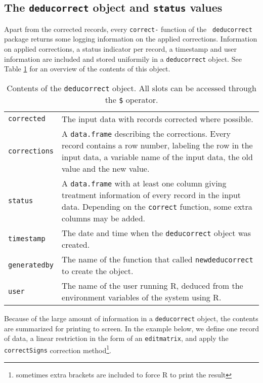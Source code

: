 \documentclass[11pt, fleqn, a4paper]{article}
\begin{document}
\subsection{The {\tt deducorrect} object and {\tt status} values}
\label{deducorrectObjectSection}
Apart from the corrected records, every {\tt correct-} function of the {\tt
deducorrect} package returns some logging information on the applied
corrections. Information on applied corrections, a status indicator per record,
a timestamp and user information are included and stored uniformily in a
{\tt deducorrect} object. See Table \ref{deducorrectObject} for an
overview of the contents of this object.
%
\begin{table}
\begin{threeparttable}
\caption{Contents of the {\tt deducorrect} object. All slots can be accessed through the {\tt \$} operator.}
\label{deducorrectObject}
\begin{tabular}{lp{}}
\hline
{\tt corrected}   & The input data with records corrected where possible.\\
{\tt corrections} & A {\tt data.frame} describing the corrections. Every record contains a row number, labeling the
row in the input data, a variable name of the input data, the old value and the new value.\\
{\tt status} & A {\tt data.frame} with at least one column giving treatment information of every record in the input data.
    Depending on the {\tt correct} function, some extra columns may be added. \\
{\tt timestamp}   & The date and time when the {\tt deducorrect} object was created.\\
{\tt generatedby} & The name of the function that called {\tt newdeducorrect} to create the object.\\
{\tt user}        & The name of the user running R, deduced from the environment variables of the system using R.\\
\hline
\end{tabular}
\end{threeparttable}
\end{table}
%
Because of the large amount of information in a {\tt deducorrect} object, the
contents are summarized for printing to screen. In the example below, we define one
record of data, a linear restriction in the form of an {\tt editmatrix}, and
apply the {\tt correctSigns} correction method\footnote{sometimes extra
brackets are included to force R to print the result}.
\end{document}
